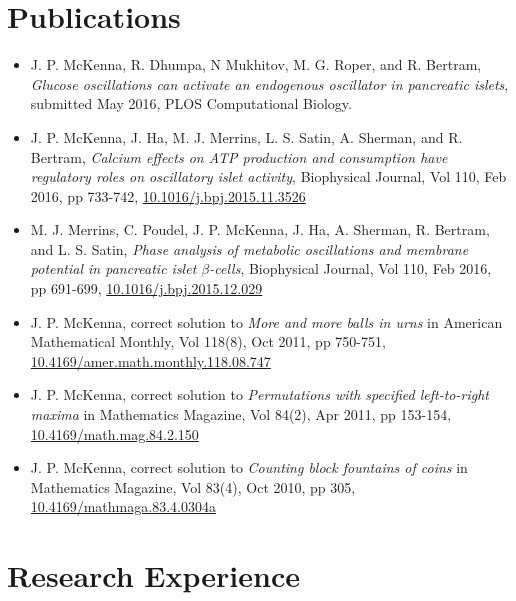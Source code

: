 \documentclass[11pt]{cv}
\begin{document}
\section*{Publications}
\label{sec:orgheadline6}
\begin{itemize}
\item J. P. McKenna, R. Dhumpa, N Mukhitov, M. G. Roper, and R. Bertram, \emph{Glucose oscillations can activate an endogenous oscillator in pancreatic islets}, submitted May 2016, PLOS Computational Biology.\\
\item J. P. McKenna, J. Ha, M. J. Merrins, L. S. Satin, A. Sherman, and R. Bertram, \emph{Calcium effects on ATP production and consumption have regulatory roles on oscillatory islet activity}, Biophysical Journal, Vol 110, Feb 2016, pp 733-742, \href{http://dx.doi.org/10.1016/j.bpj.2015.11.3526}{10.1016/j.bpj.2015.11.3526}\\
\item M. J. Merrins, C. Poudel, J. P. McKenna, J. Ha, A. Sherman, R. Bertram, and L. S. Satin, \emph{Phase analysis of metabolic oscillations and membrane potential in pancreatic islet \(\beta\)-cells}, Biophysical Journal, Vol 110, Feb 2016, pp 691-699, \href{http://dx.doi.org/10.1016/j.bpj.2015.12.029}{10.1016/j.bpj.2015.12.029}\\
\item J. P. McKenna, correct solution to \emph{More and more balls in urns} in American Mathematical Monthly, Vol 118(8), Oct 2011, pp 750-751, \href{http://dx.doi.org/10.4169/amer.math.monthly.118.08.747}{10.4169/amer.math.monthly.118.08.747}\\
\item J. P. McKenna, correct solution to \emph{Permutations with specified left-to-right maxima} in Mathematics Magazine, Vol 84(2), Apr 2011, pp 153-154, \href{http://dx.doi.org/10.4169/math.mag.84.2.150}{10.4169/math.mag.84.2.150}\\
\item J. P. McKenna, correct solution to \emph{Counting block fountains of coins} in Mathematics Magazine, Vol 83(4), Oct 2010, pp 305, \href{http://www.jstor.org/stable/10.4169/mathmaga.83.4.0304a}{10.4169/mathmaga.83.4.0304a}\\
\end{itemize}
\section*{Research Experience}
\label{sec:orgheadline10}
\end{document}
